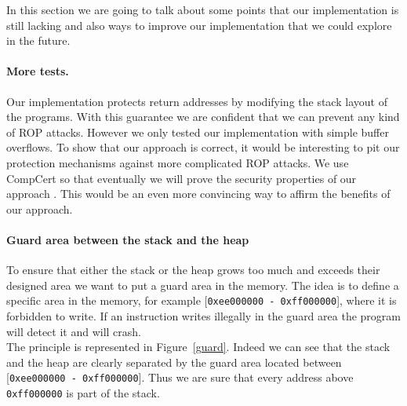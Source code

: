 \documentclass[11pt]{sdm}
\begin{document}
In this section we are going to talk about some points that our implementation is still lacking and also ways to improve our implementation that we could explore in the future.

\paragraph{More tests.}
\label{par:More tests}
Our implementation protects return addresses by modifying the stack layout of the programs. With this guarantee we are confident that we can prevent any kind of ROP attacks. 
However we only tested our implementation with simple buffer overflows. To show that our approach is correct, it would be interesting to pit our protection mechanisms against more complicated ROP attacks. We use CompCert so that eventually we will prove the security properties of our approach . This would be an even more convincing way to affirm the benefits of our approach.


\paragraph{Guard area between the stack and the heap}
\label{par:guard_area}
To ensure that either the stack or the heap grows too much and exceeds their designed area we want to put a guard area in the memory. The idea is to define a specific area in the memory, for example [\texttt{0xee000000 - \texttt{0xff000000}}], where it is forbidden to write. If an instruction writes illegally in the guard area the program will detect it and will crash.\\
The principle is represented in Figure~\ref{guard}. Indeed we can see that the stack and the heap are clearly separated by the guard area located between [\texttt{0xee000000 - \texttt{0xff000000}}]. Thus we are sure that every address above \texttt{0xff000000} is part of the stack.
\end{document}
